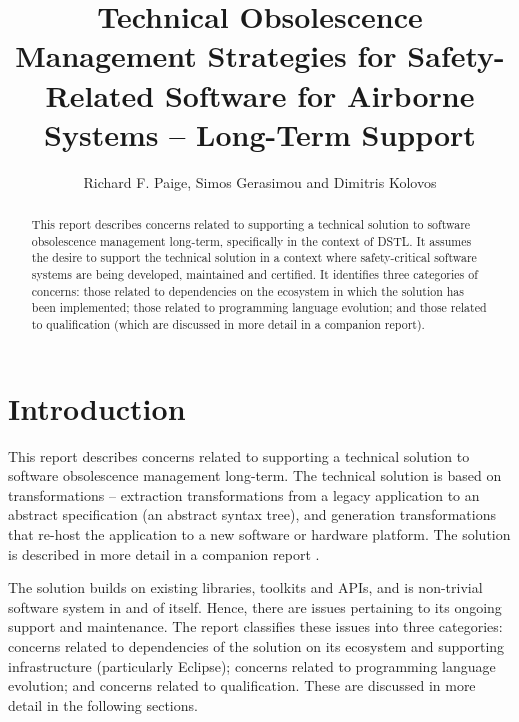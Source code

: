 \documentclass{llncs}
\begin{document}
\title{Technical Obsolescence Management Strategies for Safety-Related Software for Airborne Systems -- Long-Term Support}

\author{Richard F. Paige, Simos Gerasimou and Dimitris Kolovos}

\maketitle

\begin{abstract}
This report describes concerns related to supporting a technical solution to software obsolescence management long-term,
specifically in the context of DSTL. It assumes the desire to support the technical solution in a context where safety-critical
software systems are being developed, maintained and certified. It identifies three categories of concerns: those related
to dependencies on the ecosystem in which the solution has been implemented; those related to programming language
evolution; and those related to qualification (which are discussed in more detail in a companion report).
\end{abstract}

\section{Introduction}


This report describes concerns related to supporting a technical solution to software obsolescence management long-term.
The technical solution is based on transformations -- extraction transformations from a legacy application to an abstract
specification (an abstract syntax tree), and generation transformations that re-host the application to a new software or
hardware platform. The solution is described in more detail in a companion report \cite{DSTL-Report}.

The solution builds on existing libraries, toolkits and APIs, and is  non-trivial software system in and of
itself. Hence, there are issues pertaining to its ongoing support and maintenance. The report classifies these issues
into three categories: concerns related to dependencies of the solution on its ecosystem and supporting infrastructure
(particularly Eclipse); concerns related to programming language evolution; and concerns related to qualification. These
are discussed in more detail in the following sections.
\end{document}
